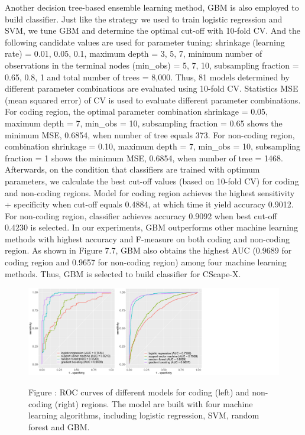 \documentclass[a4paper,nohyper,nobib,openany,justified]{tufte-book}
\begin{document}
\begin{fullwidth}
Another decision tree-based ensemble learning method, GBM is also employed to build classifier. Just like the strategy we used to train logistic regression and SVM, we tune GBM and determine the optimal cut-off with 10-fold CV. And the following candidate values are used for parameter tuning: shrinkage (learning rate) = {0.01, 0.05, 0.1}, maximum depth = {3, 5, 7}, minimum number of observations in the terminal nodes (min\_obs) = {5, 7, 10}, subsampling fraction = {0.65, 0.8, 1} and total number of trees = {8,000}. Thus, 81 models determined by different parameter combinations are evaluated using 10-fold CV. Statistics MSE (mean squared error) of CV is used to evaluate different parameter combinations. For coding region, the optimal parameter combination {shrinkage = 0.05, maximum depth = 7, min\_obs = 10, subsampling fraction = 0.65} shows the minimum MSE, 0.6854, when number of tree equals 373. For non-coding region, combination {shrinkage = 0.10, maximum depth = 7, min\_obs = 10, subsampling fraction = 1} shows the minimum MSE, 0.6854, when number of tree = 1468. Afterwards, on the condition that classifiers are trained with optimum parameters, we calculate the best cut-off values (based on 10-fold CV) for coding and non-coding regions. Model for coding region achieves the highest sensitivity + specificity when cut-off equals 0.4884, at which time it yield accuracy 0.9012. For non-coding region, classifier achieves accuracy 0.9092 when best cut-off 0.4230 is selected. In our experiments, GBM outperforms other machine learning methods with highest accuracy and F-measure on both coding and non-coding region. As shown in Figure 7.7, GBM also obtains the highest AUC (0.9689 for coding region and 0.9657 for non-coding region) among four machine learning methods. Thus, GBM is selected to build classifier for CScape-X.

\begin{figure}[h!]
  \includegraphics[width=\linewidth]{ROC_multzMod.pdf}

  \smallskip\noindent\small Figure \thefigure:
  ROC curves of different models for coding (left) and non-coding (right) regions. The model are built with four machine learning algorithms, including logistic regression, SVM, random forest and GBM.
  \label{fig:ROC_multzMod}%
\end{figure}


\end{fullwidth}
\end{document}
